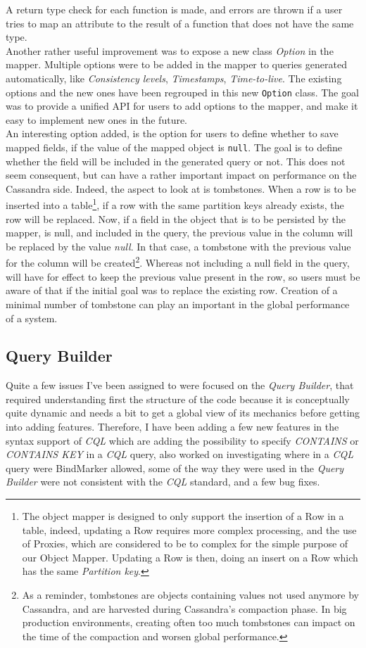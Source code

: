 \documentclass[a4paper]{report}
\begin{document}
A return type check for each function is made, and errors are thrown if a user tries to map an attribute to the result of a function that does not have the same type.\\
Another rather useful improvement was to expose a new class \emph{Option} in the mapper. Multiple options were to be added in the mapper to queries generated automatically, like \emph{Consistency levels}, \emph{Timestamps}, \emph{Time-to-live}. The existing options and the new ones have been regrouped in this new \verb;Option; class. The goal was to provide a unified API for users to add options to the mapper, and make it easy to implement new ones in the future.\\
An interesting option added, is the option for users to define whether to save mapped fields, if the value of the mapped object is \verb;null;. The goal is to define whether the field will be included in the generated query or not. This does not seem consequent, but can have a rather important impact on performance on the Cassandra side. Indeed, the aspect to look at is tombstones. When a row is to be inserted into a table\footnote{The object mapper is designed to only support the insertion of a Row in a table, indeed, updating a Row requires more complex processing, and the use of Proxies, which are considered to be to complex for the simple purpose of our Object Mapper. Updating a Row is then, doing an insert on a Row which has the same \emph{Partition key}.}, if a row with the same partition keys already exists, the row will be replaced. Now, if a field in the object that is to be persisted by the mapper, is null, and included in the query, the previous value in the column will be replaced by the value \emph{null}. In that case, a tombstone with the previous value for the column will be created\footnote{As a reminder, tombstones are objects containing values not used anymore by Cassandra, and are harvested during Cassandra's compaction phase. In big production environments, creating often too much tombstones can impact on the time of the compaction and worsen global performance.}. Whereas not including a null field in the query, will have for effect to keep the previous value present in the row, so users must be aware of that if the initial goal was to replace the existing row. Creation of a minimal number of tombstone can play an important in the global performance of a system.

\subsection{Query Builder}
Quite a few issues I've been assigned to were focused on the \emph{Query Builder}, that required understanding first the structure of the code because it is conceptually quite dynamic and needs a bit to get a global view of its mechanics before getting into adding features. Therefore, I have been adding a few new features in the syntax support of \emph{CQL} which are adding the possibility to specify \emph{CONTAINS} or \emph{CONTAINS KEY} in a \emph{CQL} query, also worked on investigating where in a \emph{CQL} query were BindMarker allowed, some of the way they were used in the \emph{Query Builder} were not consistent with the \emph{CQL} standard, and a few bug fixes.
\end{document}
